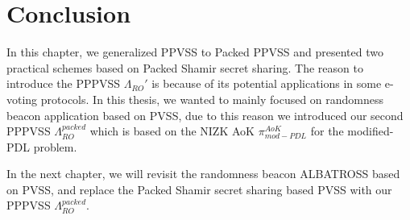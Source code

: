 
% 


\section{Conclusion}
In this chapter, we generalized PPVSS to Packed PPVSS and presented two practical schemes based on 
Packed Shamir secret sharing. The reason to introduce the PPPVSS $\Lambda_{RO}'$ is because of its 
potential applications in some e-voting protocols. In this thesis, we wanted to mainly focused on randomness beacon 
application based on PVSS, due to this reason we introduced our second PPPVSS $\Lambda_{RO}^{packed}$ which is based on the
NIZK AoK $\pi_{mod-PDL}^{AoK}$ for the modified-PDL problem.\par

In the next chapter, we will revisit the randomness beacon ALBATROSS \cite{cryptoeprint:2020/644} based on PVSS, 
and replace the Packed Shamir secret sharing based PVSS with our PPPVSS $\Lambda_{RO}^{packed}$. 

